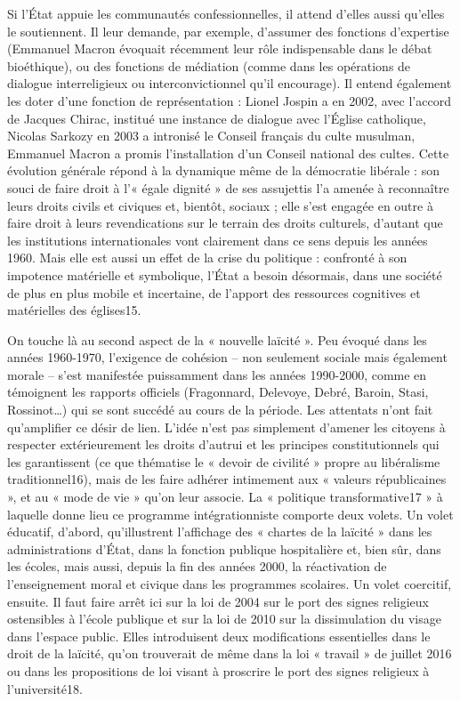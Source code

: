 Si l’État appuie les communautés confessionnelles, il attend d’elles aussi qu’elles le soutiennent. Il leur demande, par exemple, d’assumer des fonctions d’expertise (Emmanuel Macron évoquait récemment leur rôle indispensable dans le débat bioéthique), ou des fonctions de médiation (comme dans les opérations de dialogue interreligieux ou interconvictionnel qu’il encourage). Il entend également les doter d’une fonction de représentation : Lionel Jospin a en 2002, avec l’accord de Jacques Chirac, institué une instance de dialogue avec l’Église catholique, Nicolas Sarkozy en 2003 a intronisé le Conseil français du culte musulman, Emmanuel Macron a promis l’installation d’un Conseil national des cultes. Cette
évolution générale répond à la dynamique même de la démocratie libérale : son souci de faire droit à l’« égale dignité » de ses assujettis l’a amenée à reconnaître leurs droits civils et civiques et, bientôt, sociaux ; elle s’est engagée en outre à faire droit à leurs revendications sur le terrain des droits culturels, d’autant que les institutions internationales vont clairement dans ce sens depuis les années 1960. Mais elle est aussi un effet de la crise du politique : confronté à son impotence matérielle et symbolique, l’État a besoin désormais, dans une société de plus en plus mobile et incertaine, de l’apport des ressources cognitives et matérielles des églises15.

On touche là au second aspect de la « nouvelle laïcité ». Peu évoqué dans les années 1960-1970, l’exigence de cohésion – non seulement sociale mais également morale – s’est manifestée puissamment dans les années 1990-2000, comme en témoignent les rapports officiels (Fragonnard, Delevoye, Debré, Baroin, Stasi, Rossinot…) qui se sont succédé au cours de la période. Les attentats n’ont fait qu’amplifier ce désir de lien. L’idée n’est pas simplement d’amener les citoyens à respecter extérieurement les droits d’autrui et les principes constitutionnels qui les garantissent (ce que thématise le « devoir de civilité » propre au libéralisme traditionnel16), mais de les faire adhérer intimement aux « valeurs républicaines », et au « mode de vie » qu’on leur associe. La « politique transformative17 » à laquelle donne lieu ce programme intégrationniste comporte deux volets. Un volet éducatif, d’abord, qu’illustrent l’affichage des « chartes de la laïcité » dans les administrations d’État, dans la fonction publique hospitalière et, bien sûr, dans les écoles, mais aussi, depuis la fin des années 2000, la réactivation de l’enseignement moral et civique dans les programmes scolaires. Un volet coercitif, ensuite. Il faut faire arrêt ici sur la loi de 2004 sur le port des signes religieux ostensibles à l’école publique et sur la loi de 2010 sur la dissimulation du visage dans l’espace public. Elles introduisent deux modifications essentielles dans le droit de la laïcité, qu’on trouverait de même dans la loi « travail » de juillet 2016 ou dans les propositions de loi visant à proscrire le port des signes religieux à l’université18.

